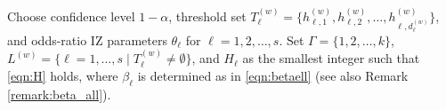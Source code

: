 \documentclass[11pt]{article}
\begin{document}
\begin{algorithm}[h!]
	\caption{First Pass of Procedure Bernoulli Recycled Feasibility, $\mathcal{BRF}^{(w)}, w=1$}\label{alg:berf}
{\fontsize{10}{13}\selectfont	
\begin{algorithmic}
	\State [{\bf Setup}:] Choose confidence level $1-\alpha$, threshold set $T_\ell^{(w)}=\{h_{\ell, 1}^{(w)},h_{\ell, 2}^{(w)},\ldots,h_{\ell, d_\ell^{(w)}}^{(w)}\}$, and odds-ratio IZ parameters $\theta_\ell$ for $\ell=1,2,\ldots, s$. Set $\Gamma =\{1,2,\ldots,k\}$, $L^{(w)}=\{\ell=1,\ldots,s\mid T_\ell^{(w)}\not=\emptyset\}$, and $H_\ell$ as the smallest integer such that \eqref{eqn:H} holds,
    where $\beta_\ell$ is determined as in \eqref{eqn:betaell} (see also Remark \ref{remark:beta_all}).


\end{algorithmic}}
\end{algorithm}
\end{document}
